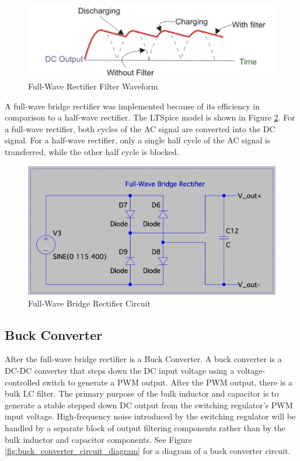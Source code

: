 \documentclass[conference]{IEEEtran}
\begin{document}
\begin{figure}[h]
    \centering
    \includegraphics[width=1.0\linewidth]{full-wave_bridge_rectifier_filter_waveform.png}
    \caption{Full-Wave Rectifier Filter Waveform}
    \label{fig:full-wave_bridge_rectifier_filter_waveform_diagram}
\end{figure}


A full-wave bridge rectifier was implemented because of its efficiency in comparison to a half-wave rectifier. The LTSpice model is shown in Figure \ref{fig:full-wave_bridge_rectifier_circuit_diagram}. For a full-wave rectifier, both cycles of the AC signal are converted into the DC signal. For a half-wave rectifier, only a single half cycle of the AC signal is transferred, while the other half cycle is blocked. 

\begin{figure}[htp]
    \centering
    \includegraphics[width=1.0\linewidth]{full-wave_bridge_rectifier_circuit.png}
    \caption{Full-Wave Bridge Rectifier Circuit}
    \label{fig:full-wave_bridge_rectifier_circuit_diagram}
\end{figure}

\subsection{Buck Converter}
After the full-wave bridge rectifier is a Buck Converter. A buck converter is a DC-DC converter that steps down the DC input voltage using a voltage-controlled switch to generate a PWM output. After the PWM output, there is a bulk LC filter. The primary purpose of the bulk inductor and capacitor is to generate a stable stepped down DC output from the switching regulator's PWM input voltage. High-frequency noise introduced by the switching regulator will be handled by a separate block of output filtering components rather than by the bulk inductor and capacitor components. See Figure \ref{fig:buck_converter_circuit_diagram} for a diagram of a buck converter circuit.
\end{document}
